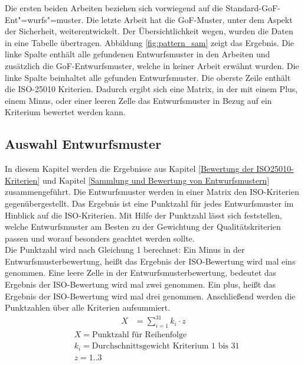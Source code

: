 Die ersten beiden Arbeiten beziehen sich vorwiegend auf die Standard-\ac{GoF}-Ent"=wurfs"=muster. Die letzte Arbeit hat die \ac{GoF}-Muster, unter dem Aspekt der Sicherheit, weiterentwickelt. Der Übersichtlichkeit wegen, wurden die Daten in eine Tabelle übertragen. Abbildung \ref{fig:pattern_sam} zeigt das Ergebnis. Die linke Spalte enthält alle gefundenen Entwurfsmuster in den Arbeiten und zusätzlich die \ac{GoF}-Entwurfsmuster, welche in keiner Arbeit erwähnt wurden. Die linke Spalte beinhaltet alle gefunden Entwurfsmuster. Die oberste Zeile enthält die ISO-25010 Kriterien. Dadurch ergibt sich eine Matrix, in der mit einem Plus, einem Minus, oder einer leeren Zelle das Entwurfsmuster in Bezug auf ein Kriterium bewertet werden kann. \\

\subsection{Auswahl Entwurfsmuster}

In diesem Kapitel werden die Ergebnisse aus Kapitel \ref{Bewertung der ISO25010-Kriterien} und Kapitel \ref{Sammlung und Bewertung von Entwurfsmustern} zusammengeführt. Die Entwurfsmuster werden in einer Matrix den ISO-Kriterien gegenübergestellt. Das Ergebnis ist eine Punktzahl für jedes Entwurfsmuster im Hinblick auf die ISO-Kriterien. Mit Hilfe der Punktzahl lässt sich feststellen, welche Entwurfsmuster am Besten zu der Gewichtung der Qualitätskriterien passen und worauf besonders geachtet werden sollte.\\

Die Punktzahl wird nach Gleichung 1 berechnet: Ein Minus in der Entwurfsmusterbewertung, heißt das Ergebnis der ISO-Bewertung wird mal eins genommen. Eine leere Zelle in der Entwurfsmusterbewertung, bedeutet das Ergebnis der ISO-Bewertung wird mal zwei genommen. Ein plus, heißt das Ergebnis der ISO-Bewertung wird mal drei genommen. Anschließend werden die Punktzahlen über alle Kriterien aufsummiert.\\

\begin{align}
	X &= \sum_{i=1}^{31} k_i\cdot z
\end{align}
\begin{align*}
	&X = \text{Punktzahl für Reihenfolge} \\
	&k_i = \text{Durchschnittsgewicht Kriterium 1 bis 31} \\
	&z = \text{1..3}
\end{align*}

